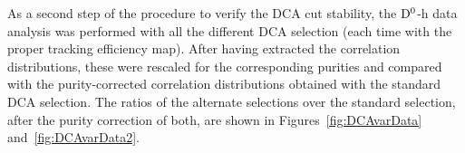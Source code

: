 As a second step of the procedure to verify the DCA cut stability, the ${\rm D^0}$-h data analysis was performed with all the different DCA selection (each time with the proper tracking efficiency map). After having extracted the correlation distributions, these were rescaled for the corresponding purities and compared with the purity-corrected correlation distributions obtained with the standard DCA selection.
The ratios of the alternate selections over the standard selection, after the purity correction of both, are shown in Figures~\ref{fig:DCAvarData} and~\ref{fig:DCAvarData2}.

